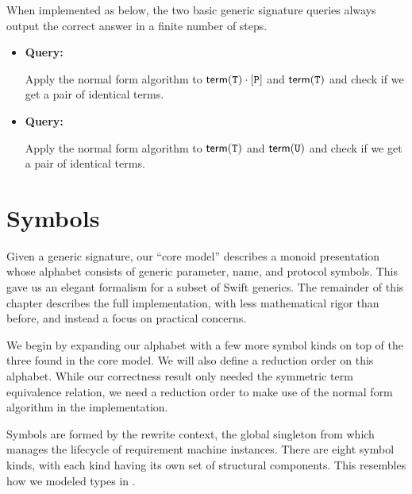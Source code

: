 \documentclass[../generics]{subfiles}
\begin{document}
\begin{mdframed}[leftline=false,rightline=false,linecolor=black,linewidth=2pt]
When implemented as below, the two basic generic signature queries always output the correct answer in a finite number of steps.
\begin{itemize}
\item \textbf{Query:} 

Apply the normal form algorithm to $\mathsf{term}(\texttt{T})\cdot[\texttt{P}]$ and $\mathsf{term}(\texttt{T})$ and check if we get a pair of identical terms.

\item \textbf{Query:} 

Apply the normal form algorithm to $\mathsf{term}(\texttt{T})$ and $\mathsf{term}(\texttt{U})$ and check if we get a pair of identical terms.
\end{itemize}
\end{mdframed}

\section{Symbols}\label{rqm symbols}

Given a generic signature, our ``core model'' describes a monoid presentation whose alphabet consists of generic parameter, name, and protocol symbols. This gave us an elegant formalism for a subset of Swift generics. The remainder of this chapter describes the full implementation, with less mathematical rigor than before, and instead a focus on practical concerns.

We begin by expanding our alphabet with a few more symbol kinds on top of the three found in the core model. We will also define a reduction order on this alphabet. While our correctness result only needed the symmetric term equivalence relation, we need a reduction order to make use of the normal form algorithm in the implementation.

Symbols are formed by the rewrite context, the global singleton from  which manages the lifecycle of requirement machine instances. There are eight symbol kinds, with each kind having its own set of structural components. This resembles how we modeled types in .
\end{document}
